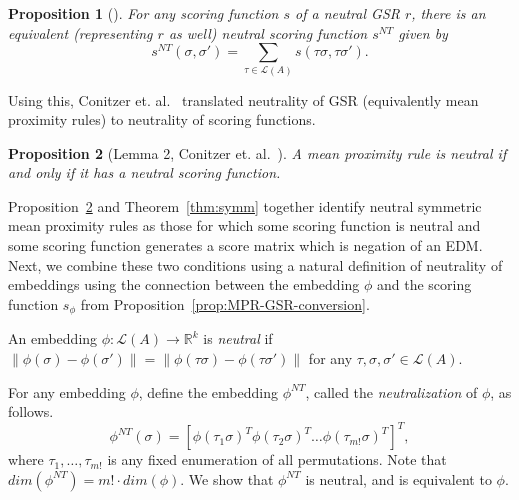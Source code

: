 \documentclass[10pt,letterpaper]{article}
\newcommand{\calL}{{\mathcal{L}}}
\newcommand{\rank}{{\calL(A)}}
\newtheorem{proposition}{Proposition}
\newenvironment{definition}[1][Definition]{\begin{trivlist}
\item[\hskip \labelsep {\bfseries #1}]}{\end{trivlist}}
\newcommand{\nt}{NT}
\begin{document}
\begin{proposition}[\cite{CRX09}] For any scoring function $s$ of a neutral GSR $r$, there is an equivalent (representing $r$ as well) neutral scoring function $s^{\nt}$ given by 
\begin{equation}
s^{\nt}(\sigma,\sigma') = \sum_{\tau \in \rank} s(\tau \sigma, \tau \sigma').
\label{eqn:s-nt}
\end{equation}
\label{prop:neutral-scoring-equivalent}
\end{proposition}

Using this, Conitzer et. al.~\cite{CRX09} translated neutrality of GSR (equivalently mean proximity rules) to neutrality of scoring functions.
\begin{proposition}[Lemma 2, Conitzer et. al.~\cite{CRX09}]
A mean proximity rule is neutral if and only if it has a neutral scoring function.
\label{prop:gsr-neutral}
\end{proposition}

Proposition~\ref{prop:gsr-neutral} and Theorem~\ref{thm:symm} together identify neutral symmetric mean proximity rules as those for which some scoring function is neutral and some scoring function generates a score matrix which is negation of an EDM. Next, we combine these two conditions using a natural definition of neutrality of embeddings using the connection between the embedding $\phi$ and the scoring function $s_{\phi}$ from Proposition~\ref{prop:MPR-GSR-conversion}.

\begin{definition}[Neutral Embedding]
An embedding $\phi:\rank \rightarrow \mathbb{R}^k$ is \emph{neutral} if $\|\phi(\sigma)-\phi(\sigma')\| = \|\phi(\tau \sigma)-\phi(\tau\sigma')\|$ for any $\tau,\sigma,\sigma' \in \rank$.
\end{definition}

For any embedding $\phi$, define the embedding $\phi^{\nt}$, called the \emph{neutralization} of $\phi$, as follows. 
\begin{equation}
\phi^{\nt}(\sigma) = [\phi(\tau_1 \sigma)^T \phi(\tau_2 \sigma)^T \ldots \phi(\tau_{m!} \sigma)^T]^T,
\label{eqn:phi-nt}
\end{equation}
where $\tau_1,\ldots,\tau_{m!}$ is any fixed enumeration of all permutations. Note that $dim(\phi^{\nt}) = m! \cdot dim(\phi)$. We show that $\phi^{\nt}$ is neutral, and is equivalent to $\phi$. 
\end{document}
